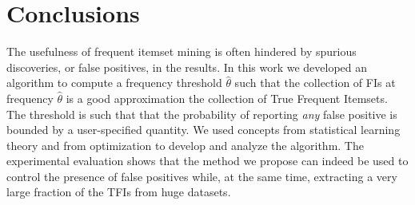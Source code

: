 \section{Conclusions}\label{sec:concl}
The usefulness of frequent itemset mining is often hindered by spurious discoveries,
or false positives, in the results. In this work we developed an algorithm to compute
a frequency threshold
$\hat\theta$ such that the collection of FIs at frequency $\hat\theta$ is a
good approximation the collection of True Frequent Itemsets. The threshold is
such that that the probability of reporting \emph{any} false positive
is bounded by a user-specified quantity. We used concepts from statistical learning
theory and from optimization to develop and analyze the algorithm. The
experimental evaluation shows that the method we propose
can indeed be used to control the presence of false positives while, at the
same time, extracting a very large fraction of the TFIs from huge datasets. 
%
% 
